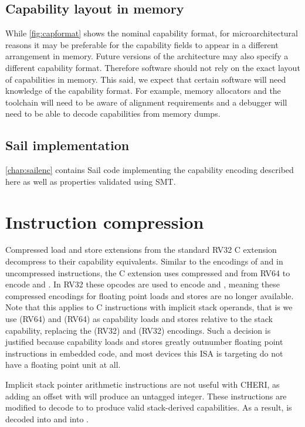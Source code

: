 \subsection{Capability layout in memory}

While \cref{fig:capformat} shows the nominal capability format, for microarchitectural reasons it may be preferable for the capability fields to appear in a different arrangement in memory.
Future versions of the architecture may also specify a different capability format.
Therefore software should not rely on the exact layout of capabilities in memory.
This said, we expect that certain software will need knowledge of the capability format.
For example, memory allocators and the toolchain will need to be aware of alignment requirements and a debugger will need to be able to decode capabilities from memory dumps.

\subsection{Sail implementation}

\cref{chap:sailenc} contains Sail code implementing the capability
encoding described here as well as properties validated using SMT.

\section{Instruction compression}
\label{sec:c-extension}

Compressed load and store extensions from the standard RV32 C extension decompress to their capability equivalents.
Similar to the encodings of  and  in uncompressed instructions, the C extension uses compressed  and  from RV64 to encode  and .
In RV32 these opcodes are used to encode  and , meaning these compressed encodings for floating point loads and stores are no longer available.
Note that this applies to C instructions with implicit stack operands, that is we use  (RV64) and  (RV64) as capability loads and stores relative to the stack capability, replacing the  (RV32) and  (RV32) encodings.
Such a decision is justified because capability loads and stores greatly outnumber floating point instructions in embedded code, and most devices this ISA is targeting do not have a floating point unit at all.

Implicit stack pointer arithmetic instructions are not useful with CHERI, as adding an offset with  will produce an untagged integer.
These instructions are modified to decode to  to produce valid stack-derived capabilities.
As a result,  is decoded into  and  into .

